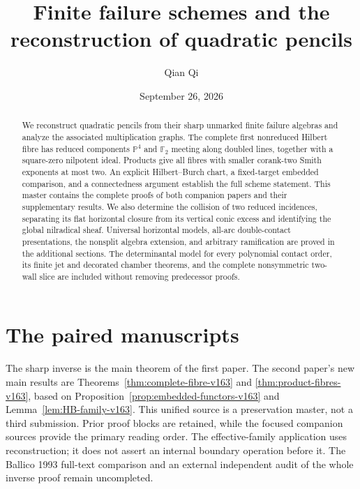\documentclass[11pt,reqno]{amsart}
\numberwithin{equation}{section}
\theoremstyle{definition}\newtheorem{definition}[theorem]{Definition}
\theoremstyle{remark}\newtheorem{remark}[theorem]{Remark}
\newcommand{\Pj}{\mathbb P}\newcommand{\A}{\mathbb A}
\begin{document}
\title[Finite failure schemes and quadratic pencils]{Finite failure schemes and the reconstruction of quadratic pencils}
\author{Qian Qi}
\date{September 26, 2026}
\begin{abstract}
We reconstruct quadratic pencils from their sharp unmarked finite
failure algebras and analyze the associated multiplication graphs.
The complete first nonreduced Hilbert fibre has reduced components
$\Pj^4$ and $\mathbb F_2$ meeting along doubled lines, together with
a square-zero nilpotent ideal. Products give all fibres with smaller
corank-two Smith exponents at most two. An explicit Hilbert--Burch
chart, a fixed-target embedded comparison, and a connectedness
argument establish the full scheme statement. This master contains
the complete proofs of both companion papers and their supplementary
results. We also determine the collision of
two reduced incidences, separating its flat horizontal closure from
its vertical conic excess and identifying the global nilradical sheaf.
Universal horizontal models, all-arc double-contact presentations,
the nonsplit algebra extension, and arbitrary ramification are
proved in the additional sections.
The determinantal model for every polynomial contact order, its finite
jet and decorated chamber theorems, and the complete nonsymmetric
two-wall slice are included without removing predecessor proofs.
\end{abstract}
\maketitle
\section*{The paired manuscripts}
\label{sec:introduction-v153}
The sharp inverse is the main theorem of the first paper. The second
paper's new main results are
Theorems~\ref{thm:complete-fibre-v163} and
\ref{thm:product-fibres-v163}, based on
Proposition~\ref{prop:embedded-functors-v163} and
Lemma~\ref{lem:HB-family-v163}. This unified source is a preservation
master, not a third submission. Prior proof blocks are retained,
while the focused companion sources provide the primary reading order.
The effective-family application uses reconstruction; it does not
assert an internal boundary operation before it. The Ballico 1993
full-text comparison and an external independent audit of the whole
inverse proof remain uncompleted.
\end{document}
